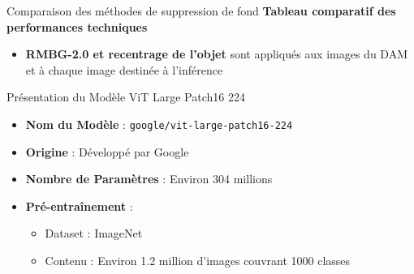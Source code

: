\documentclass{beamer}
\begin{document}
\begin{frame}{Comparaison des méthodes de suppression de fond}
    \textbf{Tableau comparatif des performances techniques}
    \begin{table}[]
        \centering
        \caption{Comparaison entre U2Net et RMBG-2.0}
    \end{table}
    \begin{itemize}
        \item \textbf{RMBG-2.0 et recentrage de l'objet} sont appliqués aux images du DAM et à chaque image destinée à l'inférence
    \end{itemize}
\end{frame}

\begin{frame}{Présentation du Modèle ViT Large Patch16 224}
    \begin{itemize}
        \item \textbf{Nom du Modèle} : \texttt{google/vit-large-patch16-224}
        \item \textbf{Origine} : Développé par Google
        \item \textbf{Nombre de Paramètres} : Environ 304 millions
        \item \textbf{Pré-entraînement} : 
        \begin{itemize}
            \item Dataset : ImageNet
            \item Contenu : Environ 1.2 million d'images couvrant 1000 classes
        \end{itemize}
    \end{itemize}
    \vspace{0.5cm}
\end{frame}
\end{document}
